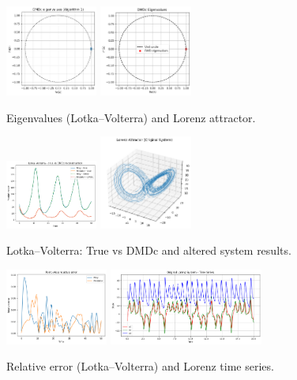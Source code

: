 \documentclass[a4paper,12pt]{report}
\theoremstyle{definition}
\numberwithin{equation}{section}
\begin{document}
\begin{figure}[h!]
    \centering
    \includegraphics[width=0.27\textwidth]{OELV.png}\hspace{2cm}
    \includegraphics[width=0.27\textwidth]{OEL.png}
    \caption{Eigenvalues (Lotka–Volterra) and Lorenz attractor.}

\end{figure}
\begin{figure}[h!]
    \centering
    \includegraphics[width=0.27\textwidth]{OLV.png}\hspace{2cm}
    \includegraphics[width=0.27\textwidth]{OLA.png}
    \caption{Lotka–Volterra: True vs DMDc and altered system results.}
\end{figure}
\begin{figure}[h!]
    \centering
    \includegraphics[width=0.3\textwidth]{POINTWISE LV.png}\hspace{1cm}
    \includegraphics[width=0.45\textwidth]{OLT.png}
   \caption{Relative error (Lotka–Volterra) and Lorenz time series.}
\end{figure}
\end{document}
